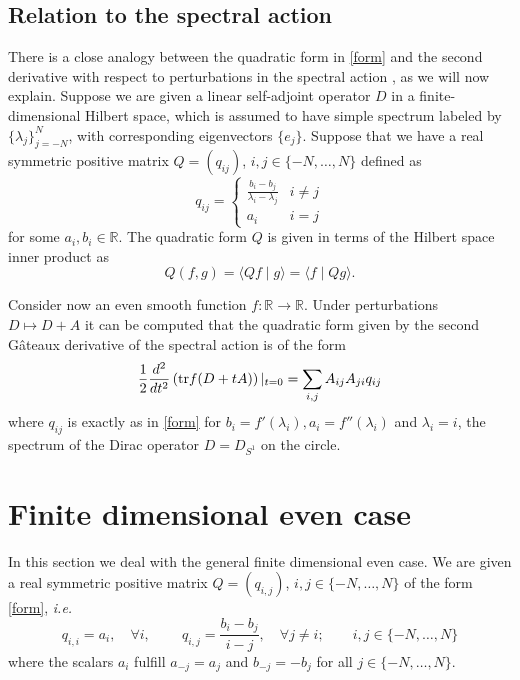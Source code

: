 \documentclass{amsart}
\def\tr{{\rm Tr}}
\def\R{{\mathbb R}}
\def\tr{{\rm tr}}
\def\tr{{\rm tr}}
\def\R{{\mathbb R}}
\def\tr{{\rm tr}}
\begin{document}
\subsection{Relation to the spectral action}
There is a close analogy between the quadratic form in \eqref{form} and the second derivative with respect to perturbations in the spectral action \cite{CC96}, as we will now explain. 
Suppose we are given a linear self-adjoint operator $D$ in a finite-dimensional Hilbert space, which is assumed to have simple spectrum labeled by $\{ \lambda_j\}_{j=-N}^N$, with corresponding eigenvectors $\{e_j\}$.
Suppose that we have a real symmetric positive matrix $Q=(q_{ij})$, $i,j\in \{-N,\ldots,N\}$ defined as
\begin{equation}\label{form2}
  q_{ij} = \left\{ \begin{array}{ll} \frac{b_i - b_j}{\lambda_i -\lambda_j }  & i \neq j \\
a_i & i = j \end{array}
    \right.
\end{equation}
for some $a_i,b_i \in \R$.
The quadratic form $Q$ is given in terms of the Hilbert space inner product as 
\begin{equation}\label{Qquad}
	Q(f,g)=\langle Q f\mid g\rangle=\langle  f\mid Q g\rangle.
\end{equation}



Consider now an even smooth function $f: \R \to \R$. Under perturbations $D \mapsto D+A$ it can be computed that the quadratic form given by the second G\^ateaux derivative of the spectral action is of the form \cite{Han06,Sui11,Skr13,NSkr21,NS21}
$$
\frac 12 \frac{d^2}{dt^ 2} \left( \tr f(D+t A) \right)|_{t=0} = \sum_{i,j} A_{ij} A_{ji} q_{ij}
$$
where $q_{ij}$ is exactly as in \eqref{form} for $b_i = f' (\lambda_i), a_i = f'' (\lambda_i)$ and $\lambda_i = i$, the spectrum of the Dirac operator $D=D_{S^1}$ on the circle.


\section{Finite dimensional even case}


In this section we deal with the general finite dimensional even case.  We are given a real symmetric positive  matrix $Q=(q_{i,j})$, $i,j\in \{-N,\ldots,N\}$ of the form \eqref{form}, {\em i.e.}
\begin{equation*}
	q_{i,i}=a_i,\quad  \forall i, \qquad\ q_{i,j}=\frac{b_i-b_j}{i-j}, \quad \forall j\neq i;
  \qquad i,j\in \{-N,\ldots,N\}	
  \end{equation*}
where the scalars $a_i$ fulfill $a_{-j}=a_j$ and $b_{-j}=-b_j$  for all $j\in \{-N,\ldots,N\}$.
\end{document}

